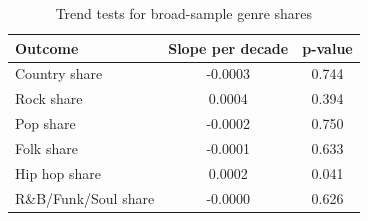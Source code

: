 \begin{table}[H]
\centering
\caption{Trend tests for broad-sample genre shares}
\label{tab:genre_trends}
\begin{tabular}{lcc}
\toprule
Outcome & Slope per decade & p-value \\
\midrule
Country share & -0.0003 & 0.744 \\
Rock share & 0.0004 & 0.394 \\
Pop share & -0.0002 & 0.750 \\
Folk share & -0.0001 & 0.633 \\
Hip hop share & 0.0002 & 0.041 \\
R\&B/Funk/Soul share & -0.0000 & 0.626 \\
\bottomrule
\end{tabular}
\end{table}
